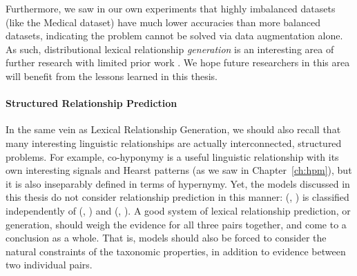 Furthermore, we saw in our own experiments that highly imbalanced datasets
(like the Medical dataset) have much lower accuracies than more balanced
datasets, indicating the problem cannot be solved via data augmentation alone.
As such, distributional lexical relationship {\em generation} is an interesting
area of further research with limited prior work
\cite{fu:2014:acl,nayak:2015:techreport,espinosaanke:2016:emnlp}. We hope
future researchers in this area will benefit from the lessons learned in this
thesis.

\paragraph{Structured Relationship Prediction}

In the same vein as Lexical Relationship Generation, we should also recall that
many interesting linguistic relationships are actually interconnected,
structured problems. For example, co-hyponymy is a useful linguistic
relationship with its own interesting signals and Hearst patterns (as we saw in
Chapter~\ref{ch:hpm}), but it is also inseparably defined in terms of
hypernymy. Yet, the models discussed in this thesis do not consider relationship
prediction in this manner: (, ) is classified independently
of (, ) and (, ). A good system of
lexical relationship prediction, or generation, should weigh the evidence for
all three pairs together, and come to a conclusion as a whole. That is, models
should also be forced to consider the natural constraints of the taxonomic
properties, in addition to evidence between two individual pairs.



